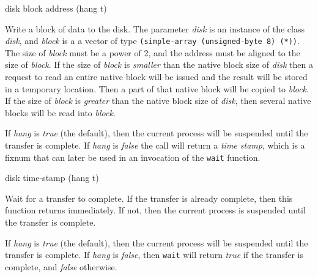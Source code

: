  {disk block address \key (hang t)}

Write a block of data to the disk.  The parameter \textit{disk} is an
instance of the class \textit{disk}, and \textit{block} is a a vector
of type \texttt{(simple-array (unsigned-byte 8) (*))}.  The size of
\textit{block} must be a power of 2, and the address must be aligned
to the size of \textit{block}.  If the size of \textit{block} is
\emph{smaller} than the native block size of \textit{disk} then a
request to read an entire native block will be issued and the result
will be stored in a temporary location.  Then a part of that native
block will be copied to \textit{block}.  If the size of \textit{block}
is \emph{greater} than the native block size of \textit{disk}, then
several native blocks will be read into \textit{block}.

If \textit{hang} is \emph{true} (the default), then the current
process will be suspended until the transfer is complete.
If \textit{hang} is \emph{false} the call will return a \emph{time
  stamp}, which is a fixnum that can later be used in an invocation of
the \texttt{wait} function.

 {disk time-stamp \key (hang t)}

Wait for a transfer to complete.  If the transfer is already complete,
then this function returns immediately.  If not, then the current
process is suspended until the transfer is complete. 

If \textit{hang} is \emph{true} (the default), then the current
process will be suspended until the transfer is complete.
If \textit{hang} is \emph{false}, then \texttt{wait} will return
\emph{true} if the transfer is complete, and \emph{false} otherwise. 

